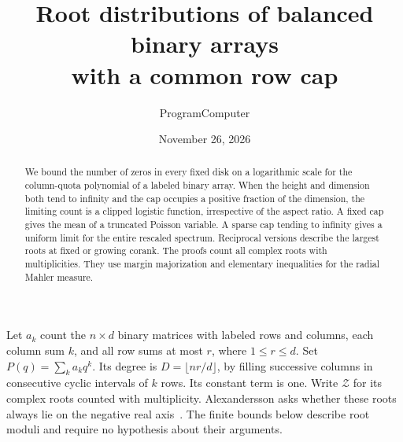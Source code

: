\documentclass[11pt]{article}
\title{Root distributions of balanced binary arrays\\with a common row cap}
\author{ProgramComputer}
\date{November 26, 2026}
\newcommand{\Z}{\mathcal{Z}}
\begin{document}
\maketitle
\begin{abstract}
We bound the number of zeros in every fixed disk on a logarithmic scale for the column-quota polynomial of a labeled binary array. When the height and dimension both tend to infinity and the cap occupies a positive fraction of the dimension, the limiting count is a clipped logistic function, irrespective of the aspect ratio. A fixed cap gives the mean of a truncated Poisson variable. A sparse cap tending to infinity gives a uniform limit for the entire rescaled spectrum. Reciprocal versions describe the largest roots at fixed or growing corank. The proofs count all complex roots with multiplicities. They use margin majorization and elementary inequalities for the radial Mahler measure.
\end{abstract}

Let $a_k$ count the $n\times d$ binary matrices with labeled rows and columns, each column sum $k$, and all row sums at most $r$, where $1\le r\le d$. Set $P(q)=\sum_k a_kq^k$. Its degree is $D=\lfloor nr/d\rfloor$, by filling successive columns in consecutive cyclic intervals of $k$ rows. Its constant term is one. Write $\Z$ for its complex roots counted with multiplicity. Alexandersson asks whether these roots always lie on the negative real axis~\cite{symcat}. The finite bounds below describe root moduli and require no hypothesis about their arguments.
\end{document}
